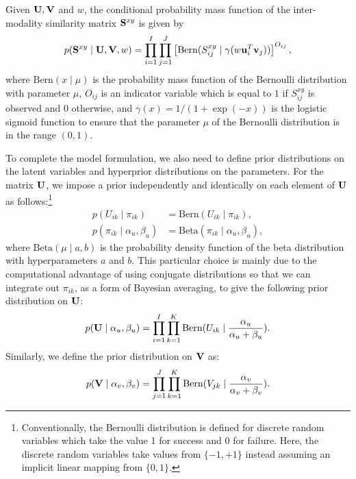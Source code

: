 Given $ \U, \V  $ and $w$, the conditional probability mass function of the inter-modality similarity matrix $\S^{xy}$ is given by
\begin{align}
p(\S^{xy}\mid \U, \V, w ) = \prod\limits_{i=1}^{I}\prod\limits_{j=1}^{J} \left[\mbox{Bern}(S^{xy}_{ij}\mid\gamma(w\u_i^{T}\v_j))\right]^{O_{ij}},\nonumber
\end{align}
where $ \mbox{Bern}(x\mid \mu) $ is the probability mass function of the \mbox{Bernoulli} distribution with parameter $ \mu $, $O_{ij}$ is an indicator variable which is equal to $ 1 $ if $ S_{ij}^{xy} $ is observed and $ 0 $ otherwise, and $ \gamma(x) = 1/(1+\exp(-x))$ is the logistic sigmoid function to ensure that the parameter $\mu$ of the Bernoulli distribution is in the range $(0,1)$.

To complete the model formulation, we also need to define prior distributions on the latent variables and hyperprior distributions on the parameters.  For the matrix $\U$, we impose a prior independently and identically on each element of $\U$ as follows:\footnote{Conventionally, the Bernoulli distribution is defined for discrete random variables which take the value 1 for success and 0 for failure.  Here, the discrete random variables take values from $\{-1,+1\}$ instead assuming an implicit linear mapping from $\{0,1\}$.}
\begin{align}
p(U_{ik} \mid \pi_{ik})&=\mbox{Bern}(U_{ik}\mid\pi_{ik}),\nonumber\\
p(\pi_{ik} \mid \alpha_u,\beta_u) &= \mbox{Beta}(\pi_{ik}\mid\alpha_u,\beta_u),\nonumber
\end{align}
where $\mathrm{Beta}(\mu\mid a,b)$ is the probability density function of the \mbox{beta} distribution with hyperparameters $a$ and $b$. This particular choice is mainly due to the computational advantage of using conjugate distributions so that we can integrate out $ \pi_{ik} $, as a form of Bayesian averaging, to give the following prior distribution on $ \U $:
\begin{align}
p(\U \mid \alpha_u,\beta_u) = \prod\limits_{i=1}^{I}\prod\limits_{k=1}^{K}\mbox{Bern}(U_{ik}\mid \frac{\alpha_u}{\alpha_u+\beta_u}).\nonumber
\end{align}
Similarly, we define the prior distribution on $\V$ as:
\begin{align}
p(\V \mid \alpha_v,\beta_v) = \prod\limits_{j=1}^{J}\prod\limits_{k=1}^{K} \mbox{Bern}(V_{jk} \mid\frac{\alpha_v}{\alpha_v+\beta_v}). \nonumber
\end{align}

